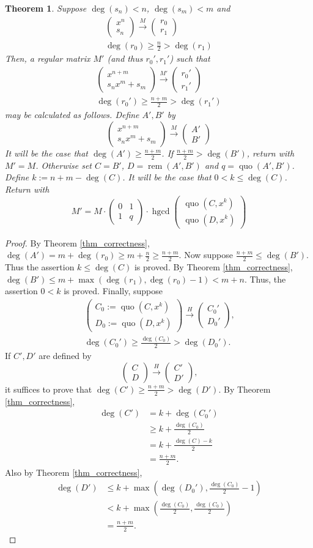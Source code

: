 \documentclass[12pt,reqno]{amsart}
\numberwithin{equation}{section}
\newtheorem{theorem}{Theorem}[section]
\newcommand{\mattt}[4]  { \left(\begin{array}{cc} #1 & #2 \\ #3 & #4 \end{array} \right)}
\newcommand{\matto}[2]  { \left(\begin{array}{cc} #1 \\ #2 \end{array} \right)}
\newcommand{\op}[1]  { \operatorname{ #1 }}
\begin{document}
\begin{theorem}
\label{thm_nm}
Suppose $\deg(s_n) < n$, $\deg(s_m) < m$ and
\begin{gather*}
\matto{x^n}{s_n} \overset{M}{\longrightarrow} \matto{r_0}{r_1}\\
\deg(r_0) \ge \frac{n}{2} > \deg(r_1)
\end{gather*}
Then, a regular matrix $M'$ (and thus $r_0', r_1'$) such that
\begin{gather*}
\matto{x^{n+m}}{s_n x^m + s_m} \overset{M'}{\longrightarrow} \matto{r_0'}{r_1'}\\
\deg(r_0') \ge \frac{n+m}{2} > \deg(r_1')
\end{gather*}
may be calculated as follows. Define $A', B'$ by
\begin{equation*}
\matto{x^{n+m}}{s_n x^m + s_m} \overset{M}{\longrightarrow} \matto{A'}{B'}
\end{equation*}
It will be the case that $\deg(A') \ge \frac{n+m}{2}$. If $\frac{n+m}{2} > \deg(B')$, return with $M'=M$. Otherwise set $C = B'$, $D = \op{rem}(A',B')$ and $q=\op{quo}(A',B')$. Define $k := n + m - \deg(C)$. It will be the case that $0 < k \le \deg(C)$. Return with
\begin{equation*}
M' = M \cdot \mattt{0}{1}{1}{q} \cdot \op{hgcd} \matto{\op{quo}(C,x^k)}{\op{quo}(D,x^k)}
\end{equation*}
\end{theorem}
\begin{proof}
By Theorem \ref{thm_correctness}, $\deg(A') = m + \deg(r_0) \ge m + \frac{n}{2} \ge \frac{n+m}{2}$. Now suppose $\frac{n+m}{2} \le \deg(B')$. Thus the assertion $k \le \deg(C)$ is proved. By Theorem \ref{thm_correctness}, $\deg(B') \le m + \max(\deg(r_1), \deg(r_0) - 1) < m + n$. Thus, the assertion $0 < k$ is proved. Finally, suppose
\begin{gather*}
\matto{C_0 := \op{quo}(C,x^k)}{D_0 := \op{quo}(D,x^k)} \overset{H}{\longrightarrow} \matto{C_0'}{D_0'}\text{,}\\
\deg(C_0') \ge \frac{\deg(C_0)}{2} > \deg(D_0')\text{.}
\end{gather*}
If $C', D'$ are defined by
\begin{equation*}
\matto{C}{D} \overset{H}{\longrightarrow} \matto{C'}{D'}\text{,}
\end{equation*}
it suffices to prove that $\deg(C') \ge \frac{n+m}{2} > \deg(D')$. By Theorem \ref{thm_correctness},
\begin{align*}
\deg(C') &= k + \deg(C_0')\\
		 &\ge k + \frac{\deg(C_0)}{2}\\
		 &= k + \frac{\deg(C) - k}{2}\\
		 &= \frac{n+m}{2}\text{.}
\end{align*}
Also by Theorem \ref{thm_correctness},
\begin{align*}
\deg(D') &\le k + \max(\deg(D_0'), \frac{\deg(C_0)}{2} - 1)\\
		 & < k + \max(\frac{\deg(C_0)}{2}, \frac{\deg(C_0)}{2})\\
		 &= \frac{n+m}{2}\text{.}
\end{align*}
\end{proof}
\end{document}
